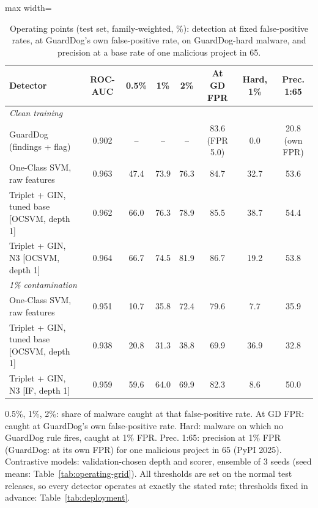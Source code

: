 \begin{table}[htbp]
\centering
\footnotesize
\caption{Operating points (test set, family-weighted, \%): detection at fixed false-positive rates, at GuardDog's own false-positive rate, on GuardDog-hard malware, and precision at a base rate of one malicious project in 65.}
\label{tab:operating}
\begin{adjustbox}{max width=\linewidth}
\begin{tabular}{lccccccc}
\toprule
Detector & ROC-AUC & 0.5\% & 1\% & 2\% & At GD FPR & Hard, 1\% & Prec. 1:65 \\
\midrule
\multicolumn{8}{l}{\textit{Clean training}} \\
GuardDog (findings + flag) & 0.902 & -- & -- & -- & 83.6 (FPR 5.0) & 0.0 & 20.8 (own FPR) \\
One-Class SVM, raw features & 0.963 & 47.4 & 73.9 & 76.3 & 84.7 & 32.7 & 53.6 \\
Triplet + GIN, tuned base [OCSVM, depth 1] & 0.962 & 66.0 & 76.3 & 78.9 & 85.5 & 38.7 & 54.4 \\
Triplet + GIN, N3 [OCSVM, depth 1] & 0.964 & 66.7 & 74.5 & 81.9 & 86.7 & 19.2 & 53.8 \\
\midrule
\multicolumn{8}{l}{\textit{1\% contamination}} \\
One-Class SVM, raw features & 0.951 & 10.7 & 35.8 & 72.4 & 79.6 & 7.7 & 35.9 \\
Triplet + GIN, tuned base [OCSVM, depth 1] & 0.938 & 20.8 & 31.3 & 38.8 & 69.9 & 36.9 & 32.8 \\
Triplet + GIN, N3 [IF, depth 1] & 0.959 & 59.6 & 64.0 & 69.9 & 82.3 & 8.6 & 50.0 \\
\bottomrule
\end{tabular}
\end{adjustbox}
\par\smallskip
\parbox{0.95\linewidth}{\footnotesize 0.5\%, 1\%, 2\%: share of malware caught at that false-positive rate. At GD FPR: caught at GuardDog's own false-positive rate. Hard: malware on which no GuardDog rule fires, caught at 1\% FPR. Prec. 1:65: precision at 1\% FPR (GuardDog: at its own FPR) for one malicious project in 65 (PyPI 2025). Contrastive models: validation-chosen depth and scorer, ensemble of 3 seeds (seed means: Table~\ref{tab:operating-grid}). All thresholds are set on the normal test releases, so every detector operates at exactly the stated rate; thresholds fixed in advance: Table~\ref{tab:deployment}.}
\end{table}
